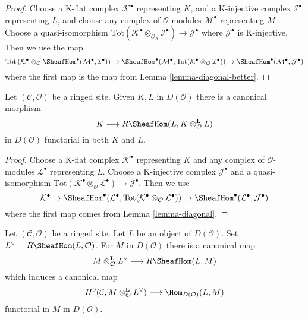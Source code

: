 \begin{proof}
Choose a K-flat complex $\mathcal{K}^\bullet$ representing $K$,
and a K-injective complex $\mathcal{I}^\bullet$ representing $L$, and
choose any complex of $\mathcal{O}$-modules $\mathcal{M}^\bullet$
representing $M$. Choose a quasi-isomorphism
$\text{Tot}(\mathcal{K}^\bullet \otimes_{\mathcal{O}_X} \mathcal{I}^\bullet)
\to \mathcal{J}^\bullet$
where $\mathcal{J}^\bullet$ is K-injective. Then we use the map
$$
\text{Tot}\left(
\mathcal{K}^\bullet \otimes_\mathcal{O}
\SheafHom^\bullet(\mathcal{M}^\bullet, \mathcal{I}^\bullet)
\right)
\to
\SheafHom^\bullet(\mathcal{M}^\bullet,
\text{Tot}(\mathcal{K}^\bullet \otimes_\mathcal{O} \mathcal{I}^\bullet))
\to
\SheafHom^\bullet(\mathcal{M}^\bullet, \mathcal{J}^\bullet)
$$
where the first map is the map from Lemma \ref{lemma-diagonal-better}.
\end{proof}

\begin{lemma}
\label{lemma-internal-hom-diagonal}
Let $(\mathcal{C}, \mathcal{O})$ be a ringed site.
Given $K, L$ in $D(\mathcal{O})$ there is a canonical morphism
$$
K \longrightarrow R\SheafHom(L, K \otimes_\mathcal{O}^\mathbf{L} L)
$$
in $D(\mathcal{O})$ functorial in both $K$ and $L$.
\end{lemma}

\begin{proof}
Choose a K-flat complex $\mathcal{K}^\bullet$ representing $K$
and any complex of $\mathcal{O}$-modules $\mathcal{L}^\bullet$
representing $L$. Choose a K-injective complex $\mathcal{J}^\bullet$
and a quasi-isomorphism
$\text{Tot}(\mathcal{K}^\bullet \otimes_\mathcal{O} \mathcal{L}^\bullet)
\to \mathcal{J}^\bullet$. Then we use
$$
\mathcal{K}^\bullet \to
\SheafHom^\bullet(\mathcal{L}^\bullet,
\text{Tot}(\mathcal{K}^\bullet \otimes_\mathcal{O} \mathcal{L}^\bullet))
\to
\SheafHom^\bullet(\mathcal{L}^\bullet, \mathcal{J}^\bullet)
$$
where the first map comes from Lemma \ref{lemma-diagonal}.
\end{proof}

\begin{lemma}
\label{lemma-dual}
Let $(\mathcal{C}, \mathcal{O})$ be a ringed site. Let $L$ be an
object of $D(\mathcal{O})$. Set $L^\vee = R\SheafHom(L, \mathcal{O})$.
For $M$ in $D(\mathcal{O})$ there is a canonical map
\begin{equation}
\label{equation-eval}
M \otimes^\mathbf{L}_\mathcal{O} L^\vee \longrightarrow R\SheafHom(L, M)
\end{equation}
which induces a canonical map
$$
H^0(\mathcal{C}, M \otimes_\mathcal{O}^\mathbf{L} L^\vee)
\longrightarrow
\Hom_{D(\mathcal{O})}(L, M)
$$
functorial in $M$ in $D(\mathcal{O})$.
\end{lemma}

